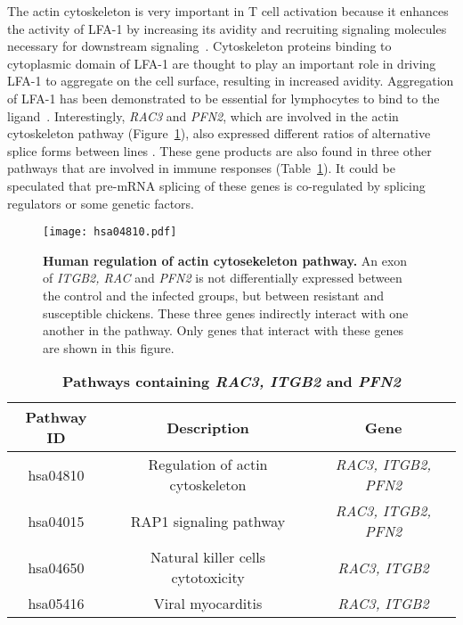 The actin cytoskeleton is very important in T cell activation because
it enhances the activity of LFA-1 by increasing its avidity and
recruiting signaling molecules necessary for downstream
signaling~\cite{dustin2000immunological, van2000avidity}.
Cytoskeleton proteins binding to cytoplasmic domain of LFA-1 are
thought to play an important role in driving LFA-1 to aggregate
on the cell surface, resulting in increased avidity.  Aggregation
of LFA-1 has been demonstrated to be essential for lymphocytes to
bind to the ligand~\cite{van1994extracellular}.  Interestingly,
{\em RAC3} and {\em PFN2}, which are involved in the actin
cytoskeleton pathway (Figure~\ref{kegg_actin}), also expressed
different ratios of alternative splice forms between lines .
These gene products are also found in three other pathways
that are involved in immune responses (Table~\ref{tab:integrin}).  It
could be speculated that pre-mRNA splicing of these genes is
co-regulated by splicing regulators or some genetic factors.

\begin{figure}[!ht]
    \begin{center}
        \texttt{[image: hsa04810.pdf]}
    \end{center}
    \caption{
        \textbf{Human regulation of actin cytosekeleton pathway.}
        An exon of {\em ITGB2, RAC} and {\em PFN2} is not
        differentially expressed between the control and the
        infected groups, but between resistant and susceptible
        chickens. These three genes indirectly interact with one
        another in the pathway.  Only genes that interact with
        these genes are shown in this figure.
    }
    \label{kegg_actin}
\end{figure}

\begin{table}[!ht]
\caption{
\textbf{Pathways containing {\em RAC3, ITGB2} and {\em PFN2}}}
\begin{center}
\begin{tabular}{ccc}
\hline
Pathway ID &  Description & Gene \\
\hline
hsa04810 & Regulation of actin cytoskeleton & {\em RAC3, ITGB2, PFN2} \\
hsa04015 & RAP1 signaling pathway & {\em RAC3, ITGB2, PFN2} \\
hsa04650 & Natural killer cells cytotoxicity & {\em RAC3, ITGB2} \\
hsa05416 & Viral myocarditis & {\em RAC3, ITGB2} \\
\hline
\end{tabular}
\begin{flushleft}
\end{flushleft}
\label{tab:integrin}
\end{center}
\end{table}

